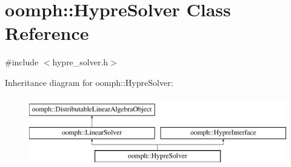 \hypertarget{classoomph_1_1HypreSolver}{}\section{oomph\+:\+:Hypre\+Solver Class Reference}
\label{classoomph_1_1HypreSolver}


{\ttfamily \#include $<$hypre\+\_\+solver.\+h$>$}

Inheritance diagram for oomph\+:\+:Hypre\+Solver\+:\begin{figure}[H]
\begin{center}
\leavevmode
\includegraphics[height=3.000000cm]{classoomph_1_1HypreSolver}
\end{center}
\end{figure}

